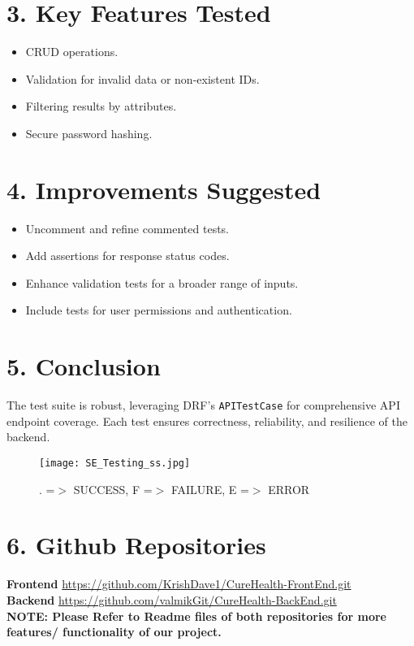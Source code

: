\documentclass[12pt]{article}
\begin{document}
\section*{3. Key Features Tested}
\begin{itemize}
    \item CRUD operations.
    \item Validation for invalid data or non-existent IDs.
    \item Filtering results by attributes.
    \item Secure password hashing.
\end{itemize}

\section*{4. Improvements Suggested}
\begin{itemize}
    \item Uncomment and refine commented tests.
    \item Add assertions for response status codes.
    \item Enhance validation tests for a broader range of inputs.
    \item Include tests for user permissions and authentication.
\end{itemize}

\section*{5. Conclusion}
The test suite is robust, leveraging DRF's \texttt{APITestCase} for comprehensive API endpoint coverage. Each test ensures correctness, reliability, and resilience of the backend.


\begin{figure}[h]
    \centering
    \texttt{[image: SE\_Testing\_ss.jpg]}
    \caption{. =$>$ SUCCESS, F =$>$ FAILURE, E =$>$ ERROR}
    \label{fig:example_image}
\end{figure}


\section*{6. Github Repositories}
\textbf{Frontend} \url{https://github.com/KrishDave1/CureHealth-FrontEnd.git}
\\
\textbf{Backend} \url{https://github.com/valmikGit/CureHealth-BackEnd.git}
\\
\textbf{NOTE: Please Refer to Readme files of both repositories for more features/ functionality of our project.}
\end{document}
